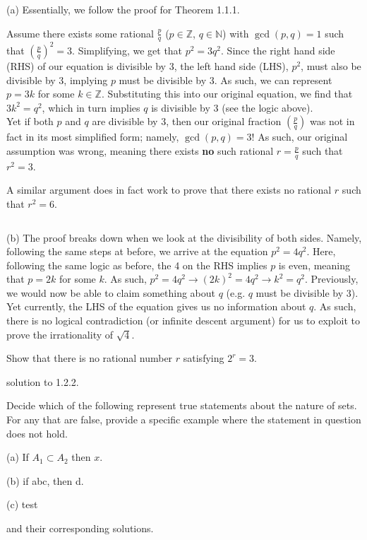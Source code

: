 \documentclass[../analysis_notes.tex]{subfiles}
\begin{document}
\begin{solution}
    (a) Essentially, we follow the proof for Theorem 1.1.1. 

    Assume there exists some rational \( \frac{p}{q} \) ($p \in \mathbb{Z}$, $q \in \mathbb{N}$) with $\gcd(p, q) = 1$ such that $\left(\frac{p}{q}\right)^2 = 3$. Simplifying, we get that $p^2 = 3q^2$. Since the right hand side (RHS) of our equation is divisible by 3, the left hand side (LHS), $p^2$, must also be divisible by 3, implying $p$ must be divisible by 3. As such, we can represent $p = 3k$ for some $k \in \mathbb{Z}$. Substituting this into our original equation, we find that $3k^2 = q^2$, which in turn implies $q$ is divisible by 3 (see the logic above). \\
    Yet if both $p$ and $q$ are divisible by 3, then our original fraction $\left(\frac{p}{q}\right)$ was not in fact in its most simplified form; namely, $\gcd(p, q) = 3$! As such, our original assumption was wrong, meaning there exists \textbf{no} such rational $r = \frac{p}{q}$ such that $r^2 = 3$.
    
    A similar argument does in fact work to prove that there exists no rational $r$ such that $r^2 = 6$.

    \[\] %

    (b) The proof breaks down when we look at the divisibility of both sides. Namely, following the same steps at before, we arrive at the equation $p^2 = 4q^2$. Here, following the same logic as before, the 4 on the RHS implies $p$ is even, meaning that $p = 2k$ for some $k$. As such, $p^2 = 4q^2 \rightarrow (2k)^2 = 4q^2 \rightarrow k^2 = q^2$. Previously, we would now be able to claim something about $q$ (e.g. $q$ must be divisible by 3). Yet currently, the LHS of the equation gives us no information about $q$. As such, there is no logical contradiction (or infinite descent argument) for us to exploit to prove the irrationality of $\sqrt{4}$.
\end{solution}


\begin{exercise}
    Show that there is no rational number \( r \) satisfying \( 2^{r} = 3 \).
\end{exercise}

\begin{solution}
    solution to 1.2.2.
\end{solution}




\begin{exercise}
    Decide which of the following represent true statements about the nature of sets. For any that are false, provide a specific example where the statement in question does not hold.

    (a) If \( A_{1} \subset A_{2} \) then \( x \).

    (b) if abc, then d.     

    (c) test
\end{exercise}

\begin{solution}
    and their corresponding solutions.
\end{solution}
\end{document}
